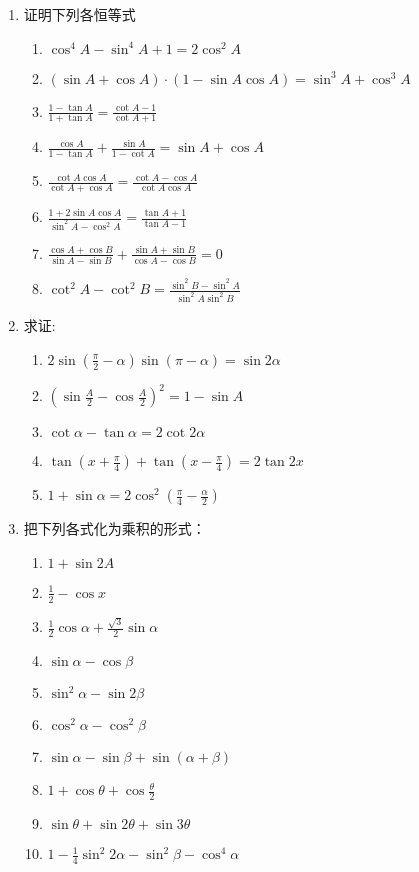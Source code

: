 \begin{enumerate}
\item 证明下列各恒等式
\begin{enumerate}
    \item $\cos ^{4} A-\sin ^{4} A+1=2 \cos ^{2} A$
    \item $(\sin A+\cos A) \cdot(1-\sin A \cos A)=\sin ^{3} A+\cos ^{3} A$
    \item $\frac{1-\tan A}{1+\tan A}=\frac{\cot A-1}{\cot A+1}$
    \item $\frac{\cos A}{1-\tan A}+\frac{\sin A}{1-\cot A}=\sin A+\cos A$
    \item $\frac{\cot A \cos A}{\cot A+\cos A}=\frac{\cot A-\cos A}{\cot A \cos A}$
    \item $\frac{1+2 \sin A \cos A}{\sin ^{2} A-\cos ^{2} A}=\frac{\tan A+1}{\tan A-1}$
    \item $\frac{\cos A+\cos B}{\sin A-\sin B}+\frac{\sin A+\sin B}{\cos A-\cos B}=0$
    \item $\cot^{2} A-\cot^{2} B=\frac{\sin ^{2} B-\sin ^{2} A}{\sin ^{2} A \sin ^{2} B}$
\end{enumerate}

\item 求证:
\begin{enumerate}
    \item $2 \sin \left(\frac{\pi}{2}-\alpha\right) \sin (\pi-\alpha)=\sin 2 \alpha$
    \item $\left(\sin \frac{A}{2}-\cos \frac{A}{2}\right)^{2}=1-\sin A$
    \item $\cot \alpha-\tan \alpha=2 \cot 2 \alpha$
\item $\tan\left(x+\frac{\pi}{4}\right)+\tan\left(x-\frac{\pi}{4}\right)=2\tan 2x$
\item $1+\sin\alpha=2\cos^2\left(\frac{\pi}{4}-\frac{\alpha}{2}\right)$
\end{enumerate}

\item 把下列各式化为乘积的形式：
\begin{multicols}{2}
\begin{enumerate}
    \item $1+\sin 2A$
    \item $\frac{1}{2}-\cos x$
    \item $\frac{1}{2}\cos\alpha+\frac{\sqrt{3}}{2}\sin\alpha$
    \item $\sin\alpha-\cos\beta$
    \item $\sin^2\alpha-\sin2\beta$
    \item $\cos^2\alpha-\cos^2\beta$
    \item $\sin\alpha-\sin\beta+\sin(\alpha+\beta)$
    \item $1+\cos\theta+\cos\frac{\theta}{2}$
    \item $\sin\theta+\sin2\theta+\sin3\theta$
    \item $1-\frac{1}{4}\sin^2 2\alpha-\sin^2\beta-\cos^4\alpha$
\end{enumerate}
\end{multicols}


\end{enumerate}
